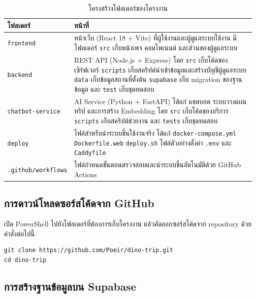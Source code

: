 \begin{table}[H]
\caption{โครงสร้างโฟลเดอร์ของโครงงาน}
\label{tab:folders}
\centering
\begin{tabular}{|L{3.4cm}|L{9.2cm}|}
\hline
\textbf{โฟลเดอร์} & \textbf{หน้าที่} \\
\hline
\texttt{frontend} & หน้าเว็บ (React 18 + Vite) ที่ผู้ใช้งานและผู้ดูแลระบบใช้งาน มีโฟลเดอร์ \texttt{src} เก็บหน้าเพจ คอมโพเนนต์ และส่วนของผู้ดูแลระบบ \\
\hline
\texttt{backend} & REST API (Node.js + Express) โดย \texttt{src} เก็บโค้ดของเซิร์ฟเวอร์ \texttt{scripts} เก็บสคริปต์นำเข้าข้อมูลและสร้างบัญชีผู้ดูแลระบบ \texttt{data} เก็บข้อมูลสถานที่ตั้งต้น \texttt{supabase} เก็บ migration ของฐานข้อมูล และ \texttt{test} เก็บชุดทดสอบ \\
\hline
\texttt{chatbot-service} & AI Service (Python + FastAPI) ได้แก่ แชตบอต ระบบวางแผนทริป และการสร้าง Embedding โดย \texttt{src} เก็บโค้ดของบริการ \texttt{scripts} เก็บสคริปต์ช่วยงาน และ \texttt{tests} เก็บชุดทดสอบ \\
\hline
\texttt{deploy} & ไฟล์สำหรับนำระบบขึ้นใช้งานจริง ได้แก่ \texttt{docker-compose.yml} \texttt{Dockerfile.web} \texttt{deploy.sh} ไฟล์ตัวอย่างตั้งค่า \texttt{.env} และ \texttt{Caddyfile} \\
\hline
\texttt{.github/workflows} & ไฟล์กำหนดขั้นตอนตรวจสอบและนำระบบขึ้นอัตโนมัติด้วย GitHub Actions \\
\hline
\end{tabular}
\end{table}

\subsection{การดาวน์โหลดซอร์สโค้ดจาก GitHub}

เปิด PowerShell ไปยังโฟลเดอร์ที่ต้องการเก็บโครงงาน แล้วคัดลอกซอร์สโค้ดจาก repository ด้วยคำสั่งต่อไปนี้

\begin{codeblock}
\begin{lstlisting}[numbers=none]
git clone https://github.com/Poeir/dino-trip.git
cd dino-trip
\end{lstlisting}
\end{codeblock}

\subsection{การสร้างฐานข้อมูลบน Supabase}

